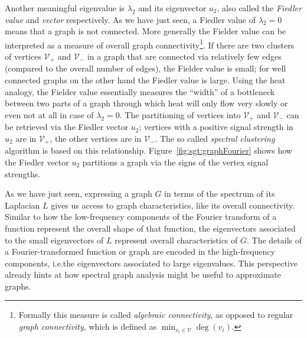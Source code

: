 Another meaningful eigenvalue is $\lambda_2$ and its eigenvector $u_2$, also called the \textit{Fiedler value} and \textit{vector} respectively.
As we have just seen, a Fiedler value of $\lambda_2 = 0$ means that a graph is not connected.
More generally the Fielder value can be interpreted as a measure of overall graph connectivity\footnote{
	Formally this measure is called \textit{algebraic connectivity}, as opposed to regular \textit{graph connectivity}, which is defined as $\min_{v_i \in \mathcal{V}} \deg(v_i)$.
}.
If there are two clusters of vertices $\mathcal{V}_+$ and $\mathcal{V}_-$ in a graph that are connected via relatively few edges (compared to the overall number of edges), the Fielder value is small;
for well connected graphs on the other hand the Fiedler value is large.
Using the heat analogy, the Fielder value essentially measures the ``width'' of a bottleneck between two parts of a graph through which heat will only flow very slowly or even not at all in case of $\lambda_2 = 0$.
The partitioning of vertices into $\mathcal{V}_+$ and $\mathcal{V}_-$ can be retrieved via the Fiedler vector $u_2$;
vertices with a positive signal strength in $u_2$ are in $\mathcal{V}_+$, the other vertices are in $\mathcal{V}_-$.
The so called \textit{spectral clustering} algorithm is based on this relationship.
Figure~\ref{fig:sgt:graphFourier} shows how the Fiedler vector $u_2$ partitions a graph via the signs of the vertex signal strengths.

As we have just seen, expressing a graph $G$ in terms of the spectrum of its Laplacian $L$ gives us access to graph characteristics, like its overall connectivity.
Similar to how the low-frequency components of the Fourier transform of a function represent the overall shape of that function, the eigenvectors associated to the small eigenvectors of $L$ represent overall characteristics of $G$.
The details of a Fourier-transformed function or graph are encoded in the high-frequency components, i.e.\@ the eigenvectors associated to large eigenvalues.
This perspective already hints at how spectral graph analysis might be useful to approximate graphs.
